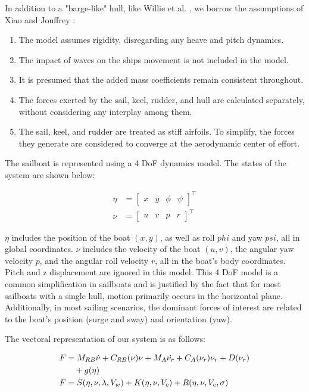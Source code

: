 \documentclass[conference]{IEEEtran}
\begin{document}
In addition to a "barge-like" hull, like Willie et al. \cite{ModelingCourseControl} , we borrow the assumptions of Xiao and Jouffrey \cite{Xiao2014Modeling}:

\begin{enumerate}
    \item The model assumes rigidity, disregarding any heave and pitch dynamics.
    \item The impact of waves on the ships movement is not included in the model.
    \item It is presumed that the added mass coefficients remain consistent throughout.
    \item The forces exerted by the sail, keel, rudder, and hull are calculated separately, without considering any interplay among them.
    \item The sail, keel, and rudder are treated as stiff airfoils. To simplify, the forces they generate are considered to converge at the aerodynamic center of effort.
\end{enumerate}

The sailboat is represented using a 4 DoF dynamics model. The states of the system are shown below:

\begin{align}
    \eta &= \begin{bmatrix} x & y & \phi & \psi \end{bmatrix}^\top \\
    \nu &= \begin{bmatrix} u & v & p & r \end{bmatrix}^\top
\end{align}

$\eta$ includes the position of the boat $(x,y)$, as well as roll $phi$ and yaw $psi$, all in global coordinates. $\nu$ includes the velocity of the boat $(u,v)$, the angular yaw velocity $p$, and the angular roll velocity $r$, all in the boat's body coordinates. Pitch and z displacement are ignored in this model. This 4 DoF model is a common simplification in sailboats and is justified by the fact that for most sailboats with a single hull, motion primarily occurs in the horizontal plane. Additionally, in most sailing scenarios, the dominant forces of interest are related to the boat's position (surge and sway) and orientation (yaw).

The vectoral representation of our system is as follows:

\begin{align}
   F &= M_{RB}\dot{\nu} + C_{RB}(\nu)\nu + M_A\dot{\nu_r} + C_A(\nu_r)\nu_r + D(\nu_r) \\
   &\quad + g(\eta) \notag \\
   F &= S(\eta,\nu,\lambda,V_w) + K(\eta,\nu,V_c) + R(\eta,\nu,V_c,\sigma)
\end{align}
\end{document}
